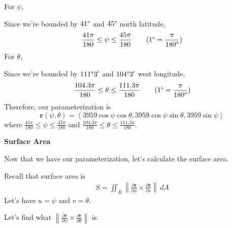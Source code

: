 \documentclass{article}
\newcommand{\lrp}[1]{\left( #1 \right)}
\newcommand{\lra}[1]{\left\langle #1 \right\rangle}
\newcommand{\norm}[1]{\left\lVert #1 \right\rVert}
\renewcommand{\r}[0]{\mathbf{r}}
\begin{document}
For $\psi$,

Since we're bounded by $41\degree$ and $45\degree$ north latitude, 
\begin{equation*}
    \frac{41\pi}{180}\leq  \psi \leq \frac{45\pi}{180}\tag{$\displaystyle1\degree = \frac{\pi}{180\degree}$}
\end{equation*}
For $\theta$,

Since we're bounded by $111\degree3'$ and $104\degree3'$ west longitude,
\begin{equation*}
    \frac{104.3\pi}{180}\leq \theta\leq \frac{111.3\pi}{180}\tag{$\displaystyle1\degree = \frac{\pi}{180\degree}$}
\end{equation*}
Therefore, our parameterization is
\begin{equation*}
    \r\lrp{\psi, \theta}=\lra{3959\cos\psi\cos\theta, 3959\cos\psi\sin\theta, 3959\sin\psi}
\end{equation*}
where $\displaystyle\frac{41\pi}{180}\leq  \psi \leq \frac{45\pi}{180}$ and $ \displaystyle\frac{104.3\pi}{180}\leq \theta\leq \frac{111.3\pi}{180}$.

\textbf{Surface Area}

Now that we have our parameterization, let's calculate the surface area.

Recall that surface area is
\begin{align*}
    S=\iint_R \norm{\frac{\partial \r}{\partial u}\times \frac{\partial \r}{\partial v}}\,dA
\end{align*}
Let's have $u=\psi$ and $v=\theta$.

Let's find what $\displaystyle \norm{\frac{\partial \r}{\partial \psi}\times \frac{\partial \r}{\partial \theta}}$ is. 
\end{document}
